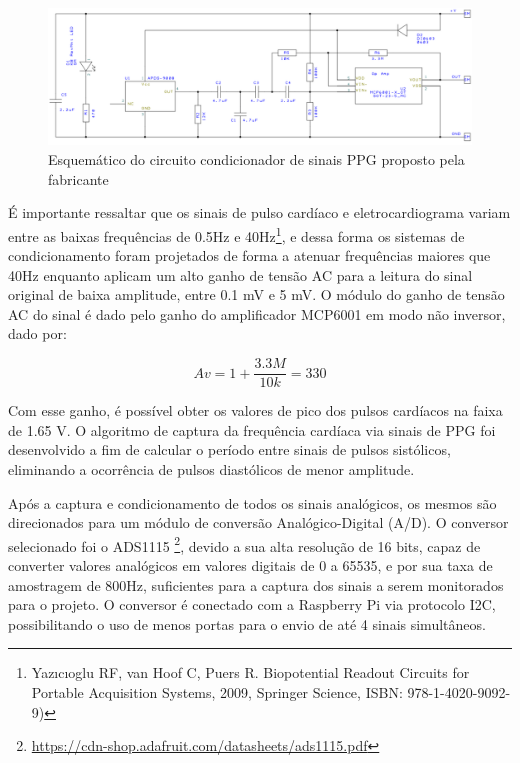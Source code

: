 \begin{figure}[h!]
    \begin{center}
        \includegraphics[scale=0.4]{figuras/ecg_sch.png}
    \end{center}
    \caption{Esquemático do circuito condicionador de sinais PPG proposto pela fabricante}
    \label{fig:ecg_sch}
\end{figure}

É importante ressaltar que os sinais de pulso cardíaco e eletrocardiograma variam 
entre as baixas frequências de 0.5Hz e 40Hz\footnote{ Yazıcıoglu RF, van Hoof C,
Puers R. Biopotential Readout Circuits for Portable Acquisition Systems, 2009,
Springer Science, ISBN: 978-1-4020-9092-9)}, e dessa forma os sistemas de 
condicionamento foram projetados de forma a atenuar frequências maiores que 40Hz 
enquanto aplicam um alto ganho de tensão AC para a leitura do sinal original de 
baixa amplitude, entre 0.1 mV e 5 mV. O módulo do ganho de tensão AC do sinal é dado pelo ganho do 
amplificador MCP6001 em modo não inversor, dado por:

\begin{equation}
  Av = 1 + \frac{3.3M}{10k} = 330
\end{equation}

Com esse ganho, é possível obter os valores de pico dos pulsos cardíacos na faixa 
de 1.65 V. O algoritmo de captura da frequência cardíaca via sinais de PPG foi desenvolvido 
a fim de calcular o período entre sinais de pulsos sistólicos, eliminando a 
ocorrência de pulsos diastólicos de menor amplitude.

Após a captura e condicionamento de todos os sinais analógicos, os mesmos são direcionados
para um módulo de conversão Analógico-Digital (A/D). O conversor selecionado foi o ADS1115 \footnote{\url{https://cdn-shop.adafruit.com/datasheets/ads1115.pdf}},
devido a sua alta resolução de 16 bits, capaz de converter valores analógicos em valores
digitais de 0 a 65535, e por sua taxa de amostragem de 800Hz, suficientes para a captura dos
sinais a serem monitorados para o projeto. O conversor é conectado com a Raspberry Pi via protocolo I2C,
possibilitando o uso de menos portas para o envio de até 4 sinais simultâneos.

